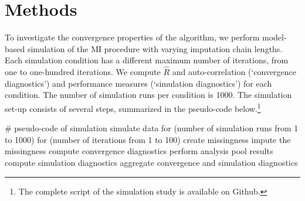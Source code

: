 \documentclass[article]{jss}
\begin{document}
% 
% 



\section{Methods} \label{sec:methods}

To investigate the convergence properties of the  algorithm, we perform model-based simulation of the MI procedure with varying imputation chain lengths. Each simulation condition has a different maximum number of iterations, from one to one-hundred iterations. We compute $\widehat{R}$ and auto-correlation (`convergence diagnostics') and performance measures (`simulation diagnostics') for each condition. The number of simulation runs per condition is 1000. %
The simulation set-up consists of several steps, summarized in the pseudo-code below.\footnote{The complete  script of the simulation study is available on Github.}

\begin{Code}
# pseudo-code of simulation 
simulate data 
for (number of simulation runs from 1 to 1000)
  for (number of iterations from 1 to 100)
    create missingness
    impute the missingness
    compute convergence diagnostics
    perform analysis
    pool results
    compute simulation diagnostics
aggregate convergence and simulation diagnostics
\end{Code}
\end{document}

